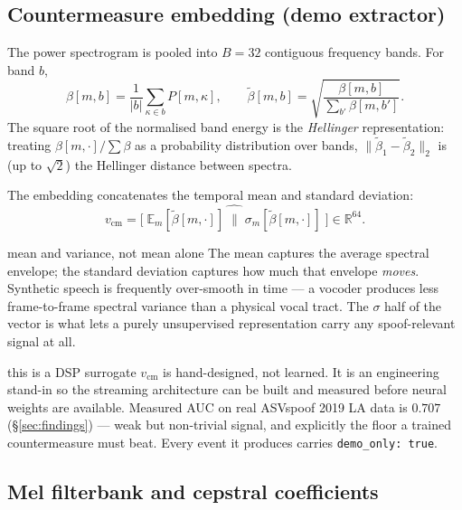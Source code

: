 \documentclass[11pt,a4paper]{article}
\newcommand{\code}[1]{\texttt{\small #1}}
\newcommand{\R}{\mathbb{R}}
\newcommand{\Ex}{\mathbb{E}}
\newcommand{\unitvec}[1]{\widehat{#1}}
\begin{document}
\subsection{Countermeasure embedding (demo extractor)}

The power spectrogram is pooled into $B = 32$ contiguous frequency bands. For band $b$,
\begin{equation}
\beta[m,b] = \frac{1}{|b|}\sum_{\kappa \in b} P[m,\kappa],
\qquad
\tilde\beta[m,b] = \sqrt{\frac{\beta[m,b]}{\sum_{b'} \beta[m,b']}} .
\end{equation}
The square root of the normalised band energy is the \emph{Hellinger} representation:
treating $\beta[m,\cdot]/\sum\beta$ as a probability distribution over bands,
$\|\tilde\beta_1 - \tilde\beta_2\|_2$ is (up to $\sqrt{2}$) the Hellinger distance
between spectra.

The embedding concatenates the temporal mean and standard deviation:
\begin{equation}
v_{\mathrm{cm}} = \unitvec{\big[\; \Ex_m[\tilde\beta[m,\cdot]] \;\big\|\; \sigma_m[\tilde\beta[m,\cdot]] \;\big]} \in \R^{64}.
\end{equation}

\begin{whybox}{mean and variance, not mean alone}
The mean captures the average spectral envelope; the standard deviation captures how
much that envelope \emph{moves}. Synthetic speech is frequently over-smooth in time ---
a vocoder produces less frame-to-frame spectral variance than a physical vocal tract.
The $\sigma$ half of the vector is what lets a purely unsupervised representation
carry any spoof-relevant signal at all.
\end{whybox}

\begin{warnbox}{this is a DSP surrogate}
$v_{\mathrm{cm}}$ is hand-designed, not learned. It is an engineering stand-in so the
streaming architecture can be built and measured before neural weights are available.
Measured AUC on real ASVspoof 2019 LA data is $0.707$ (\S\ref{sec:findings}) --- weak
but non-trivial signal, and explicitly the floor a trained countermeasure must beat.
Every event it produces carries \code{demo\_only: true}.
\end{warnbox}

\subsection{Mel filterbank and cepstral coefficients}
\end{document}
